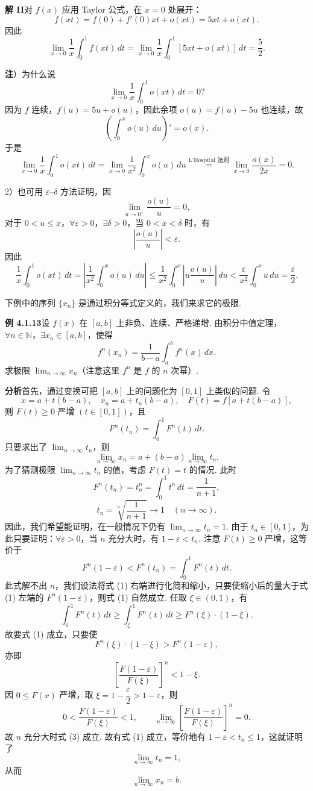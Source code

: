 \documentclass[UTF8, 12pt, fontset=fandol, oneside]{ctexart}
\begin{document}
\noindent\textbf{解 II}\quad 对 $f(x)$ 应用 Taylor 公式，在 $x=0$ 处展开：
\[
f(xt)=f(0)+f'(0)xt+o(xt)=5xt+o(xt).
\]
因此
\[
\lim_{x\to0}\frac1x\int_0^1f(xt)\,dt
=\lim_{x\to0}\frac1x\int_0^1[5xt+o(xt)]\,dt=\frac52.
\]

\noindent\textbf{注}）为什么说
\[
\lim_{x\to0}\frac1x\int_0^1o(xt)\,dt=0?
\]
因为 $f$ 连续，$f(u)=5u+o(u)$，因此余项 $o(u)=f(u)-5u$ 也连续，故
\[
\left(\int_0^x o(u)\,du\right)'=o(x).
\]
于是
\[
\lim_{x\to0}\frac1x\int_0^1o(xt)\,dt
=\lim_{x\to0}\frac1{x^2}\int_0^x o(u)\,du
\stackrel{\text{L'Hospital 法则}}{=}
\lim_{x\to0}\frac{o(x)}{2x}=0.
\]

2）也可用 $\varepsilon$--$\delta$ 方法证明，因
\[
\lim_{u\to0^+}\frac{o(u)}u=0,
\]
对于 $0<u\le x$，$\forall\varepsilon>0$，$\exists\delta>0$，当 $0<x<\delta$ 时，有
\[
\left|\frac{o(u)}u\right|<\varepsilon.
\]
因此
\[
\frac1x\int_0^1o(xt)\,dt
=\left|\frac1{x^2}\int_0^x o(u)\,du\right|
\le\frac1{x^2}\int_0^x\left|u\frac{o(u)}u\right|\,du
<\frac\varepsilon{x^2}\int_0^x u\,du=\frac\varepsilon2.
\]

下例中的序列 $\{x_n\}$ 是通过积分等式定义的，我们来求它的极限.

\noindent\textbf{例 4.1.13}\quad 设 $f(x)$ 在 $[a,b]$ 上非负、连续、严格递增. 由积分中值定理，$\forall n\in\mathbb{N}$，$\exists x_n\in[a,b]$，使得
\[
f^n(x_n)=\frac1{b-a}\int_a^b f^n(x)\,dx.
\]
求极限 $\displaystyle\lim_{n\to\infty}x_n$（注意这里 $f^n$ 是 $f$ 的 $n$ 次幂）.

\noindent\textbf{分析}\quad 首先，通过变换可把 $[a,b]$ 上的问题化为 $[0,1]$ 上类似的问题. 令
\[
x=a+t(b-a),\quad x_n=a+t_n(b-a),\quad F(t)=f[a+t(b-a)],
\]
则 $F(t)\ge0$ 严增 $(t\in[0,1])$，且
\[
F^n(t_n)=\int_0^1F^n(t)\,dt.
\]
只要求出了 $\displaystyle\lim_{n\to\infty}t_n$，则
\[
\lim_{n\to\infty}x_n=a+(b-a)\lim_{n\to\infty}t_n.
\]
为了猜测极限 $\displaystyle\lim_{n\to\infty}t_n$ 的值，考虑 $F(t)=t$ 的情况. 此时
\[
F^n(t_n)=t_n^n=\int_0^1t^n\,dt=\frac1{n+1},
\]
\[
t_n=\sqrt[n]{\frac1{n+1}}\to1\quad(n\to\infty).
\]
因此，我们希望能证明，在一般情况下仍有 $\displaystyle\lim_{n\to\infty}t_n=1$. 由于 $t_n\in[0,1]$，为此只要证明：$\forall\varepsilon>0$，当 $n$ 充分大时，有 $1-\varepsilon<t_n$. 注意 $F(t)\ge0$ 严增，这等价于
\[
F^n(1-\varepsilon)<F^n(t_n)=\int_0^1F^n(t)\,dt.
\tag{1}
\]
此式解不出 $n$，我们设法将式 (1) 右端进行化简和缩小，只要使缩小后的量大于式 (1) 左端的 $F^n(1-\varepsilon)$，则式 (1) 自然成立. 任取 $\xi\in(0,1)$，有
\[
\int_0^1F^n(t)\,dt\ge\int_\xi^1F^n(t)\,dt
\ge F^n(\xi)\cdot(1-\xi).
\]
故要式 (1) 成立，只要使
\[
F^n(\xi)\cdot(1-\xi)>F^n(1-\varepsilon),
\tag{2}
\]
亦即
\[
\left[\frac{F(1-\varepsilon)}{F(\xi)}\right]^n<1-\xi.
\tag{3}
\]
因 $0\le F(x)$ 严增，取 $\xi=1-\dfrac\varepsilon2>1-\varepsilon$，则
\[
0<\frac{F(1-\varepsilon)}{F(\xi)}<1,\qquad
\lim_{n\to\infty}\left[\frac{F(1-\varepsilon)}{F(\xi)}\right]^n=0.
\]
故 $n$ 充分大时式 (3) 成立. 故有式 (1) 成立，等价地有 $1-\varepsilon<t_n\le1$，这就证明了
\[
\lim_{n\to\infty}t_n=1,
\]
从而
\[
\lim_{n\to\infty}x_n=b.
\]
\end{document}
